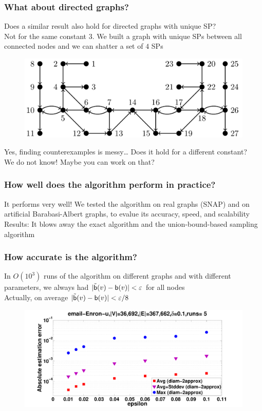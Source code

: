 \begin{frame}
  \frametitle{What about directed graphs?}
  Does a similar result also hold for directed graphs with unique SP?\\
  \quad  Not for the same constant $3$. We built a graph with unique SPs between
  all connected nodes and we can shatter a set of $4$ SPs
  \begin{figure}[H]
    \centering
    \includegraphics[scale=0.3]{imgs/uniquedirected.pdf}
  \end{figure}
  Yes, finding counterexamples is messy\ldots
  \vfill
  Does it hold for a different constant?\\
  \quad We do not know! Maybe you can work on that?
\end{frame}

\begin{frame}
  \frametitle{How well does the algorithm perform in practice?}
  It performs very well!
  \vfill
  We tested the algorithm on real graphs (SNAP) and on artificial
  Barabasi-Albert graphs, to evalue its accuracy, speed, and scalability
  \vfill
  Results: It blows away the exact algorithm and the union-bound-based
  sampling algorithm
\end{frame}

\begin{frame}
  \frametitle{How accurate is the algorithm?}
  In $O(10^3)$ runs of the algorithm on different graphs and with different
  parameters, we always had $|\tilde{\mathsf{b}}(v)-\mathsf{b}(v)|<\varepsilon$ for all
  nodes\\
  \quad Actually, on average $|\tilde{\mathsf{b}}(v)-\mathsf{b}(v)|<\varepsilon/8$
  \vfill
  \begin{figure}[H]
    \centering
    \includegraphics[scale=0.22]{imgs/email-Enron-error.pdf}
  \end{figure}
\end{frame}

